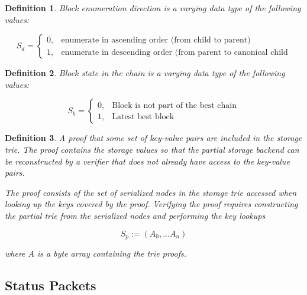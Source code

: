 \documentclass{book}
\newtheorem{definition}{Definition}
\begin{document}
\begin{definition}
    \label{defn-sequence-direction}
    Block enumeration direction is a varying data type of the following values:

    \begin{equation*}
      S_d =
      \begin{cases}
        0, & \text{enumerate in ascending order (from child to parent)} \\
        1, & \text{enumerate in descending order (from parent to canonical child}
      \end{cases}
    \end{equation*}
\end{definition}

\begin{definition}
    \label{defn-block-state}
    Block state in the chain is a varying data type of the following values:

    \begin{equation*}
      S_b =
      \begin{cases}
        0, & \text{Block is not part of the best chain} \\
        1, & \text{Latest best block}
      \end{cases}
    \end{equation*}
\end{definition}

\begin{definition}
    \label{defn-storage-proof}
    A proof that some set of key-value pairs are included in the storage trie. The proof contains
    the storage values so that the partial storage backend can be reconstructed by a verifier that
    does not already have access to the key-value pairs.
    \newline

    The proof consists of the set of serialized nodes in the storage trie accessed when looking up
    the keys covered by the proof. Verifying the proof requires constructing the partial trie from
    the serialized nodes and performing the key lookups

    \[
        S_p := (A_0, ... A_n)
    \]

    where $A$ is a byte array containing the trie proofs.
\end{definition}

\subsection{Status Packets}
\end{document}
